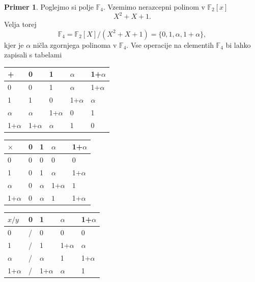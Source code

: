 \documentclass[12pt,a4paper,twoside]{article}
\theoremstyle{definition} %
\newtheorem{primer}[definicija]{Primer}
\theoremstyle{plain} %
\numberwithin{equation}{section}  %
\newcommand{\F}{\mathbb F}
\newcommand{\Fq}[1]{{\mathbb{F}_{#1}}}
\begin{document}
\begin{primer}
Poglejmo si polje $\F_4$. Vzemimo nerazcepni polinom v $\Fq{2}[x]$
$$X^2+X+1.$$
Velja torej
$$\F_4 = \F_2[X]/(X^2+X+1) = \{ 0,1,\alpha,1 +\alpha \},$$
kjer je $\alpha$ ničla zgornjega polinoma v $\F_4$.
Vse operacije na elementih $\F_4$ bi lahko zapisali s tabelami


\begin{table}[H]
  \centering
\begin{minipage}{.5\textwidth}
 \begin{tabular}{l|llll}
+          & 0          & 1          & $\alpha$   & 1+$\alpha$ \\ \hline
0          & 0          & 1          & $\alpha$   & 1+$\alpha$ \\
1          & 1          & 0          & 1+$\alpha$ & $\alpha$   \\
$\alpha$   & $\alpha$   & 1+$\alpha$ & 0          & 1          \\
1+$\alpha$ & 1+$\alpha$ & $\alpha$   & 1          & 0         
\end{tabular}
  \label{table:ses}
\end{minipage}%
\begin{minipage}{.5\textwidth}
\centering
\begin{tabular}{l|llll}
$\times$   & 0 & 1        & $\alpha$   & 1+$\alpha$ \\ \hline
0          & 0 & 0        & 0          & 0          \\
1          & 0 & 1        & $\alpha$   & 1+$\alpha$ \\
$\alpha$   & 0 & $\alpha$ & 1+$\alpha$ & $1$   \\
1+$\alpha$ & 0 & $\alpha$ & $1$   & 1+$\alpha$
\end{tabular}
\label{table:mno}
\end{minipage}
\end{table}


\begin{table}[H]
\begin{tabular}{l|llll}
$x/y$      & 0 & 1          & $\alpha$   & 1+$\alpha$ \\ \hline
0          & / & 0          & 0          & 0          \\
1          & / & 1          & 1+$\alpha$ & $\alpha$   \\
$\alpha$   & / & $\alpha$   & 1          & 1+$\alpha$ \\
1+$\alpha$ & / & 1+$\alpha$ & $\alpha$   & 1         
\end{tabular}
\label{table:delj}
\end{table}
\end{primer}
\end{document}
